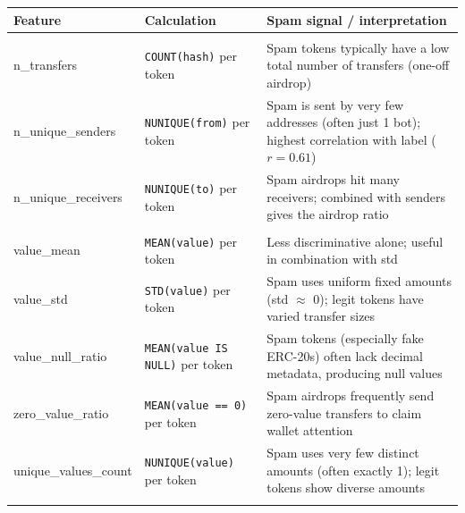 \documentclass[11pt, a4paper]{article}
\begin{document}
\vspace{0.5em}
\noindent\begin{tabular}{>{\ttfamily}p{4.6cm} >{\raggedright\arraybackslash}p{4.0cm} >{\raggedright\arraybackslash}p{5.6cm}}
\toprule
\normalfont\textbf{Feature} & \textbf{Calculation} & \textbf{Spam signal / interpretation} \\
\midrule

\multicolumn{3}{l}{\textit{Activity \& volume}} \\[2pt]

n\_transfers
  & \texttt{COUNT(hash)} per token
  & Spam tokens typically have a low total number of transfers (one-off airdrop) \\[4pt]

n\_unique\_senders
  & \texttt{NUNIQUE(from)} per token
  & Spam is sent by very few addresses (often just 1 bot); highest correlation with label ($r{=}0.61$) \\[4pt]

n\_unique\_receivers
  & \texttt{NUNIQUE(to)} per token
  & Spam airdrops hit many receivers; combined with senders gives the airdrop ratio \\[6pt]

\multicolumn{3}{l}{\textit{Transfer value}} \\[2pt]

value\_mean
  & \texttt{MEAN(value)} per token
  & Less discriminative alone; useful in combination with std \\[4pt]

value\_std
  & \texttt{STD(value)} per token
  & Spam uses uniform fixed amounts (std $\approx$ 0); legit tokens have varied transfer sizes \\[4pt]

value\_null\_ratio
  & \texttt{MEAN(value IS NULL)} per token
  & Spam tokens (especially fake ERC-20s) often lack decimal metadata, producing null values \\[4pt]

zero\_value\_ratio
  & \texttt{MEAN(value == 0)} per token
  & Spam airdrops frequently send zero-value transfers to claim wallet attention \\[4pt]

unique\_values\_count
  & \texttt{NUNIQUE(value)} per token
  & Spam uses very few distinct amounts (often exactly 1); legit tokens show diverse amounts \\[6pt]

\multicolumn{3}{l}{\textit{Block distribution}} \\[2pt]


\end{tabular}
\end{document}
